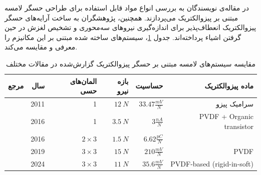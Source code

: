    در مقاله‌ی 
   \cite{qi2023PVDF}
نویسندگان به بررسی انواع مواد قابل استفاده برای طراحی حسگر لامسه مبتنی بر پیزوالکتریک می‌پردازند.
   همچنین، پژوهشگران به ساخت آرایه‌های حسگر پیزوالکتریک انعطاف‌پذیر برای اندازه‌گیری نیروهای سه‌محوری 
   \cite{huang2024piezo,yu2016PiezoArray}
    و تشخیص لغزش در حین گرفتن اشیاء
     \cite{wang2019PiezoArray}
      پرداخته‌اند. جدول \ref{tab:piezo_sensors}، سیستم‌های ساخته شده مبتنی بر این مکانیزم را معرفی و مقایسه می‌کند.
\begin{table}[t]
	\centering
	\caption{مقایسه سیستم‌های لامسه  مبتنی بر حسگر پیزوالکتریک گزارش‌‌شده در مقالات مختلف}
	\label{tab:piezo_sensors}
	\onehalfspacing
	\begin{tabular}{|r|r|r|r|r|r|}
		\hline
		\textbf{مرجع} & \textbf{سال} & \textbf{المان‌های حسی}  & \textbf{بازه نیرو} & \textbf{حساسیت} & \textbf{ماده پیزوالکتریک} \\ \hline \hline
		
		\cite{nasserii2011Piezo} & 2011 & 1 &$12 \: N$ & $33.47 \frac{mV}{N}$ & سرامیک پیزو \\ \hline
		
		\cite{spanu2016PVDF} & 2016 & 1 & 
		 $3.5 \: N$ & $3 \frac{nA}{N}$ & PVDF + Organic transistor \\ \hline
		
		\cite{yu2016PiezoArray} & 2016 & $2 \times 3 $ & $1.5 \: N$ & 
		$6.62 \frac{pC}{N}$ & \LR{PVDF} \\ \hline
		
		\cite{wang2019PiezoArray} & 2019 & $3 \times 3 $& $15 \: N$ &  $210 \frac{mV}{N}$ & PVDF \\ \hline
		
		\cite{huang2024piezo} & 2024 &$ 3‌ \times 3 $& $11 \: N$ & $35.6 \frac{mV}{N}$ & PVDF-based (rigid-in-soft) \\ \hline
		
	\end{tabular}
\end{table}

